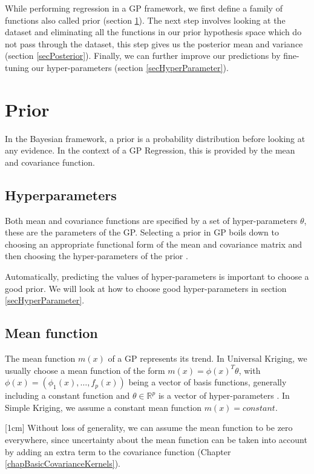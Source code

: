 While performing regression in a GP framework, we first define a family of functions also called prior (section \ref{secPrior}). The next step involves looking at the dataset and eliminating all the functions in our prior hypothesis space which do not pass through the dataset, this step gives us the posterior mean and variance (section \ref{secPosterior}). Finally, we can further improve our predictions by fine-tuning our hyper-parameters (section \ref{secHyperParameter}).

\section{Prior} \label{secPrior}
In the Bayesian framework, a prior is a probability distribution before looking at any evidence. In the context of a GP Regression, this is provided by the mean and covariance function. 

\subsection{Hyperparameters}
Both mean and covariance functions are specified by a set of hyper-parameters $\theta$, these are the parameters of the GP. Selecting a prior in GP boils down to choosing an appropriate functional form of the mean and covariance matrix and then choosing the hyper-parameters of the prior \cite{duvenaud2013structure}. 

Automatically, predicting the values of hyper-parameters is important to choose a good prior. We will look at how to choose good hyper-parameters in section \ref{secHyperParameter}. 

\subsection{Mean function}\label{subSecCH2MeanFunction}
The mean function $m(x)$ of a GP represents its trend. In Universal Kriging, we usually choose a mean function of the form $m(x) = \phi(x)^{T}\theta$, with $\phi(x) = (\phi_{1}(x), \ldots , f_{p}(x))$ being a vector of basis functions, generally including a constant function and $\theta \in \mathbb{R}^{p}$ is a vector of hyper-parameters \cite{matheron1963principles}. In Simple Kriging, we assume a constant mean function $m(x) = constant$.

[1cm]
Without loss of generality, we can assume the mean function to be zero everywhere, since uncertainty about the mean function can be taken into account by adding an extra term to the covariance function (Chapter \ref{chapBasicCovarianceKernels}).  


